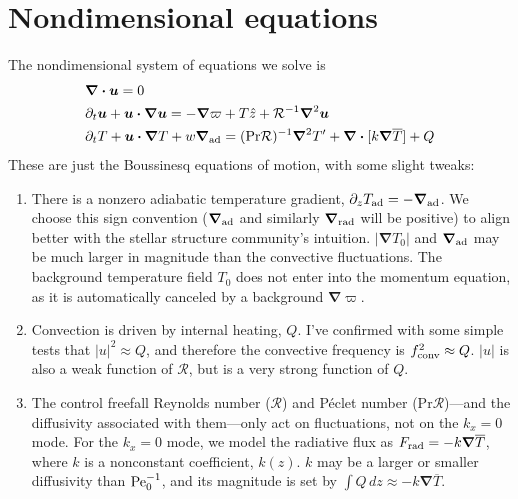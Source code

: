 \documentclass[12pt,preprint]{article}
\newcommand{\mR}{\ensuremath{\mathcal{R}}}
\newcommand\Pran{\ensuremath{\mathrm{Pr}}}
\renewcommand{\vec}[1]{\boldsymbol{#1}}
\renewcommand{\dot}{\vec{\cdot}}
\newcommand{\grad}{\vec{\nabla}}
\begin{document}
\section{Nondimensional equations}
The nondimensional system of equations we solve is
\begin{align}
&\grad\dot\vec{u} = 0 \\
&\partial_t \vec{u} + \vec{u}\dot\grad\vec{u} = -\grad \varpi + T \hat{z} + \mR^{-1}\grad^2 \vec{u} \\
&\partial_t T + \vec{u}\dot\grad T + w \grad_{\rm{ad}} = (\Pran\mR)^{-1}\grad^2 T' + \grad\dot[k \grad \overline{T}] + Q
\end{align}
These are just the Boussinesq equations of motion, with some slight tweaks:
\begin{enumerate}
\item There is a nonzero adiabatic temperature gradient, $\partial_z T_{\rm{ad}} = -\grad_{\rm{ad}}$.
We choose this sign convention ($\grad_{\rm{ad}}$ and similarly $\grad_{\rm{rad}}$ will be positive) to align better with the stellar structure community's intuition.
$|\grad T_0|$ and $\grad_{\rm{ad}}$ may be much larger in magnitude than the convective fluctuations.
The background temperature field $T_0$ does not enter into the momentum equation, as it is automatically canceled by a background $\grad \varpi$.
\item Convection is driven by internal heating, $Q$.
I've confirmed with some simple tests that $|u|^2 \approx Q$, and therefore the convective frequency is $f_{\rm{conv}}^2 \approx Q$.
$|u|$ is also a weak function of $\mR$, but is a very strong function of $Q$.
\item The control freefall Reynolds number (\mR) and P\'{e}clet number (\Pran\mR)---and the diffusivity associated with them---only act on fluctuations, not on the $k_x = 0$ mode.
For the $k_x = 0$ mode, we model the radiative flux as $F_{\rm{rad}} = -k \grad \overline{T}$, where $k$ is a nonconstant coefficient, $k(z)$.
$k$ may be a larger or smaller diffusivity than $\rm{Pe}_0^{-1}$, and its magnitude is set by $\int Q\, dz \approx -k \grad\overline{T}$.
\end{enumerate}
\end{document}
